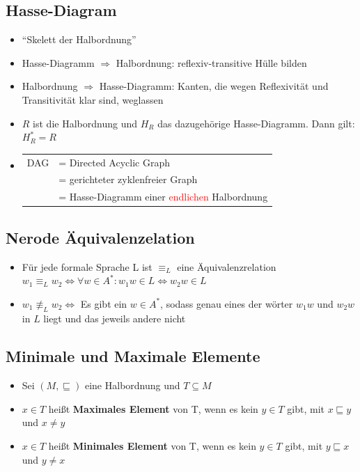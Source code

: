 \documentclass[a4paper,portrait]{scrartcl}
\begin{document}
\subsection{Hasse-Diagram}
\begin{itemize}
\item ``Skelett der Halbordnung''
\item Hasse-Diagramm $\Rightarrow$ Halbordnung: reflexiv-transitive Hülle bilden
\item Halbordnung $\Rightarrow$ Hasse-Diagramm: Kanten, die wegen Reflexivität und Transitivität klar sind, weglassen
\item $R$ ist die Halbordnung und $H_{R}$ das dazugehörige Hasse-Diagramm. Dann gilt: $ H_{R}^{*} = R $
\item 
\begin{tabular}{ll}
DAG &= Directed Acyclic Graph \\
&= gerichteter zyklenfreier Graph\\
&= Hasse-Diagramm einer \textcolor{red}{endlichen} Halbordnung
\end{tabular}
\end{itemize}
\subsection{Nerode Äquivalenzelation}
\begin{itemize}
\item Für jede formale Sprache L ist $\equiv_{L}$ eine Äquivalenzrelation \\
$ w_{1} \equiv_{L} w_{2} \Leftrightarrow \forall w \in A^{*}: w_{1}w \in L \Leftrightarrow w_{2}w \in L  $
\item $w_{1} \not\equiv_{L} w_{2} \Leftrightarrow$ Es gibt ein $ w \in A^{*} $, sodass genau eines der wörter $ w_{1}w $ und $ w_{2}w $ in $L$ liegt und das jeweils andere nicht
\end{itemize}
\subsection{Minimale und Maximale Elemente}
\begin{itemize}
\item Sei $ (M, \sqsubseteq) $ eine Halbordnung und $ T \subseteq M $
\item $ x \in T $ heißt \textbf{Maximales Element} von T, wenn es kein $ y \in T $ gibt, mit $ x \sqsubseteq y $ und $ x \neq y $
\item $ x \in T $ heißt \textbf{Minimales Element} von T, wenn es kein $ y \in T $ gibt, mit $ y \sqsubseteq x $ und $ y \neq x $
\end{itemize}
\end{document}
